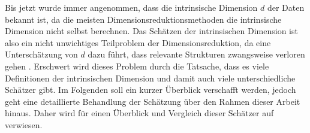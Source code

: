 Bis jetzt wurde immer angenommen, dass die intrinsische Dimension $d$ der Daten bekannt ist, da die
meisten Dimensionsreduktionsmethoden die intrinsische Dimension nicht selbst berechnen. Das
Schätzen der intrinsischen Dimension ist also ein nicht unwichtiges Teilproblem der
Dimensionsreduktion, da eine Unterschätzung von $d$ dazu führt, dass relevante Strukturen
zwangsweise verloren gehen \parencite[1]{Levina.2004}. Erschwert wird dieses Problem durch die Tatsache, dass es viele
Definitionen der intrinsischen Dimension und damit auch viele unterschiedliche Schätzer gibt. Im
Folgenden soll ein kurzer Überblick verschafft werden, jedoch geht eine detaillierte Behandlung der
Schätzung über den Rahmen dieser Arbeit hinaus. Daher wird für einen Überblick und Vergleich dieser
Schätzer auf \textcites{Campadelli.2015}{Bac.2021}{Verveer.1995} verwiesen.

